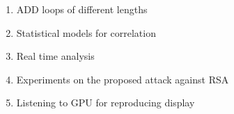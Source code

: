 \begin{enumerate}
	\item ADD loops of different lengths
	\item Statistical models for correlation
	\item Real time analysis
	\item Experiments on the proposed attack against RSA
	\item Listening to GPU for reproducing display
\end{enumerate}